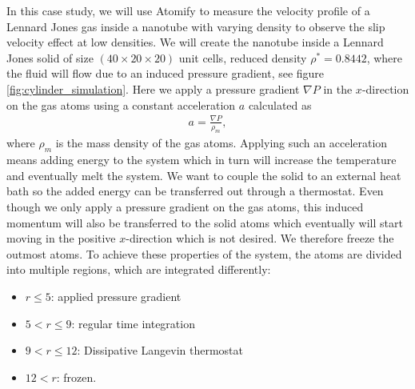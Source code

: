 \documentclass[aps,pre,twocolumn,letterpaper,floatfix,nofootinbib]{revtex4}
\begin{document}
In this case study, we will use Atomify to measure the velocity profile of a Lennard Jones gas inside a nanotube with varying density to observe the slip velocity effect at low densities.
We will create the nanotube inside a Lennard Jones solid of size  $(40\times20\times20)$ unit cells, reduced density $\rho^* = 0.8442$, where the fluid will flow due to an induced pressure gradient, see figure \ref{fig:cylinder_simulation}.
Here we apply a pressure gradient $\nabla P$ in the $x$-direction on the gas atoms using a constant acceleration $a$ calculated as
\begin{align}
	a = \frac{\nabla P}{\rho_m},
\end{align}
where $\rho_m$ is the mass density of the gas atoms.
Applying such an acceleration means adding energy to the system which in turn will increase the temperature and eventually melt the system.
We want to couple the solid to an external heat bath so the added energy can be transferred out through a thermostat.
Even though we only apply a pressure gradient on the gas atoms, this induced momentum will also be transferred to the solid atoms which eventually will start moving in the positive $x$-direction which is not desired.
We therefore freeze the outmost atoms.
To achieve these properties of the system, the atoms are divided into multiple regions, which are integrated differently:

\begin{itemize}  
	\item $r \leq 5$: applied pressure gradient
	\item $5 < r \leq 9$: regular time integration
	\item $9 < r \leq 12$: Dissipative Langevin thermostat
	\item $12 < r$: frozen.
\end{itemize}
\end{document}
